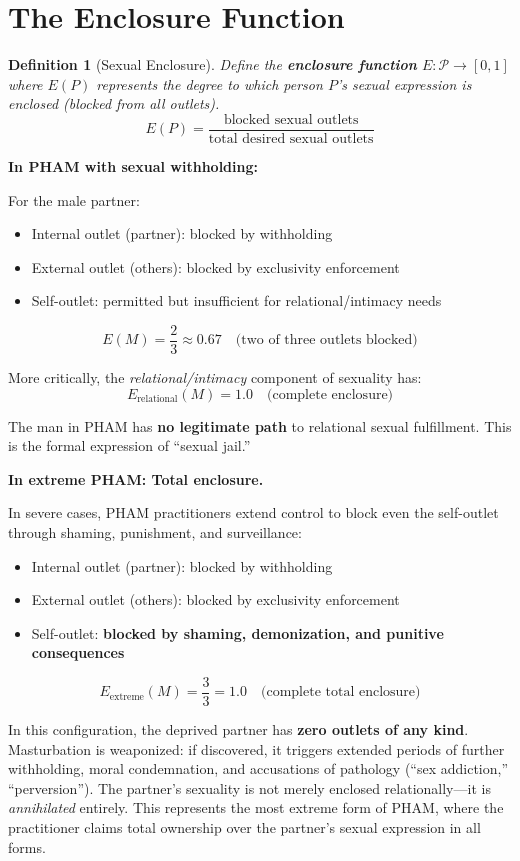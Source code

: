\documentclass[12pt,openany]{book}
\newtheorem{definition}{Definition}[chapter]
\numberwithin{equation}{chapter}
\begin{document}
\section{The Enclosure Function}

\begin{definition}[Sexual Enclosure]
Define the \textbf{enclosure function} $E: \mathcal{P} \rightarrow [0,1]$ where $E(P)$ represents the degree to which person $P$'s sexual expression is enclosed (blocked from all outlets).
\[
E(P) = \frac{\text{blocked sexual outlets}}{\text{total desired sexual outlets}}
\]
\end{definition}

\textbf{In PHAM with sexual withholding:}

For the male partner:
\begin{itemize}
    \item Internal outlet (partner): blocked by withholding
    \item External outlet (others): blocked by exclusivity enforcement
    \item Self-outlet: permitted but insufficient for relational/intimacy needs
\end{itemize}

\[
E(M) = \frac{2}{3} \approx 0.67 \quad \text{(two of three outlets blocked)}
\]

More critically, the \textit{relational/intimacy} component of sexuality has:
\[
E_{\text{relational}}(M) = 1.0 \quad \text{(complete enclosure)}
\]

The man in PHAM has \textbf{no legitimate path} to relational sexual fulfillment. This is the formal expression of ``sexual jail.''

\textbf{In extreme PHAM: Total enclosure.}

In severe cases, PHAM practitioners extend control to block even the self-outlet through shaming, punishment, and surveillance:
\begin{itemize}
    \item Internal outlet (partner): blocked by withholding
    \item External outlet (others): blocked by exclusivity enforcement
    \item Self-outlet: \textbf{blocked by shaming, demonization, and punitive consequences}
\end{itemize}

\[
E_{\text{extreme}}(M) = \frac{3}{3} = 1.0 \quad \text{(complete total enclosure)}
\]

In this configuration, the deprived partner has \textbf{zero outlets of any kind}. Masturbation is weaponized: if discovered, it triggers extended periods of further withholding, moral condemnation, and accusations of pathology (``sex addiction,'' ``perversion''). The partner's sexuality is not merely enclosed relationally---it is \textit{annihilated} entirely. This represents the most extreme form of PHAM, where the practitioner claims total ownership over the partner's sexual expression in all forms.
\end{document}

